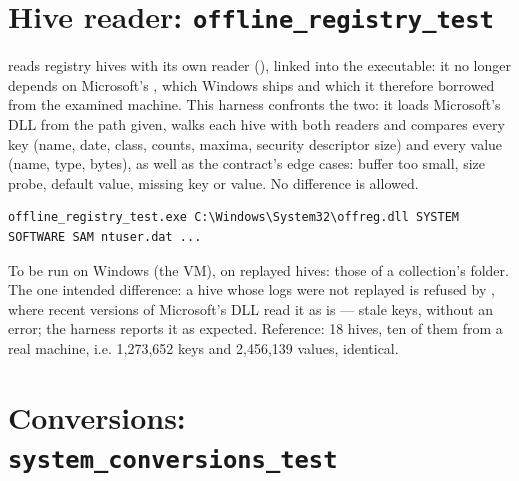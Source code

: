 \documentclass[11pt,a4paper,oneside]{report}
\begin{document}
\section{Hive reader: \texttt{offline\_registry\_test}}

\wac{} reads registry hives with its own reader
(), linked into the executable: it no longer
depends on Microsoft's , which Windows ships and which it
therefore borrowed from the examined machine. This harness confronts the two:
it loads Microsoft's DLL from the path given, walks each hive with both readers
and compares every key (name, date, class, counts, maxima, security descriptor
size) and every value (name, type, bytes), as well as the contract's edge
cases: buffer too small, size probe, default value, missing key or value. No
difference is allowed.

\begin{lstlisting}
offline_registry_test.exe C:\Windows\System32\offreg.dll SYSTEM SOFTWARE SAM ntuser.dat ...
\end{lstlisting}

To be run on Windows (the VM), on replayed hives: those of a collection's
 folder. The one intended difference: a hive whose logs were
not replayed is refused by \wac{}, where recent versions of Microsoft's DLL
read it as is — stale keys, without an error; the harness reports it as
expected. Reference: 18 hives, ten of them from a real machine, i.e. 1,273,652
keys and 2,456,139 values, identical.

\section{Conversions: \texttt{system\_conversions\_test}}
\end{document}
